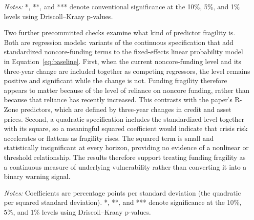 \documentclass[11pt]{article}
\begin{document}
\begin{table}[H]
\centering
\caption{\textbf{Three-year continuous fragility extension.} Coefficients are
percentage points of crisis probability associated with a
one-standard-deviation increase in the corresponding fragility measure,
standardized using the historical estimation sample. The main result is that
funding fragility has a strong standalone association with crisis risk and
substantially improves within-model fit, while the R-Zone interactions for
the funding measures remain statistically indistinguishable from zero. Using
the continuous measures therefore points to fragility as an independent
source of crisis risk, rather than evidence that fragility amplifies the
effect of an R-Zone.}
\label{tab:fragility-continuous}
\small


\medskip
\footnotesize
\textit{Notes:} *, **, and *** denote conventional significance at the 10\%,
5\%, and 1\% levels using Driscoll--Kraay p-values.
\end{table}

Two further precommitted checks examine what kind of predictor fragility is.
Both are regression models: variants of the continuous specification that
add standardized noncore-funding terms to the fixed-effects linear
probability model in Equation~\eqref{eq:baseline}. First, when the current
noncore-funding level and its three-year change are included together as
competing regressors, the level remains positive and significant while the
change is not. Funding fragility therefore appears to matter because of the
level of reliance on noncore funding, rather than because that reliance has
recently increased. This contrasts with the paper's R-Zone predictors, which
are defined by three-year changes in credit and asset prices. Second, a
quadratic specification includes the standardized level together with its
square, so a meaningful squared coefficient would indicate that crisis risk
accelerates or flattens as fragility rises. The squared term is small and
statistically insignificant at every horizon, providing no evidence of a
nonlinear or threshold relationship. The results therefore support treating
funding fragility as a continuous measure of underlying vulnerability rather
than converting it into a binary warning signal.

\begin{table}[H]
\centering
\caption{\textbf{Functional form of the noncore fragility channel.} Level and
three-year-change coefficients come from their joint specification; the
quadratic term comes from the curvature check. Both checks were precommitted.
The takeaway is that fragility risk sits in the level, not the recent change,
and rises linearly with no threshold.}
\label{tab:fragility-form}
\small


\medskip
\footnotesize
\textit{Notes:} Coefficients are percentage points per standard deviation
(the quadratic per squared standard deviation). *, **, and *** denote
significance at the 10\%, 5\%, and 1\% levels using Driscoll--Kraay p-values.
\end{table}
\end{document}
